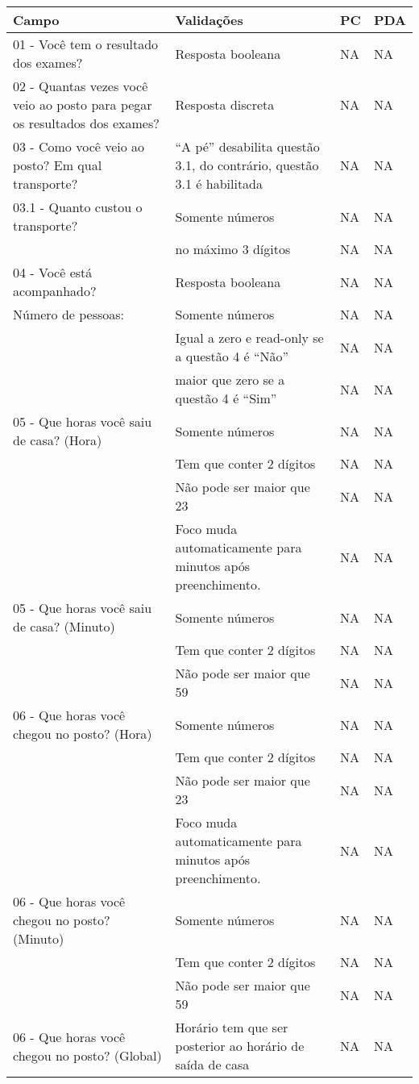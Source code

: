 \begin{longtable}{|p{}|p{}|p{}|p{}|}
\hline

Campo & Validações & PC & PDA \\ \hline

01 - Você tem o resultado dos exames? & Resposta booleana & NA & NA \\ \hline

02 - Quantas vezes você veio ao posto para pegar os resultados dos exames? & Resposta discreta & NA & NA \\ \hline

03 - Como você veio ao posto? Em qual transporte?  & ``A pé'' desabilita questão 3.1, do contrário, questão 3.1 é habilitada & NA & NA \\ \hline

03.1 - Quanto custou o transporte? & Somente números & NA & NA \\ \cline{2-4} & no máximo 3 dígitos & NA & NA \\ \hline

04 - Você está acompanhado? & Resposta booleana & NA & NA \\ \hline
Número de pessoas: & Somente números & NA & NA \\ \cline{2-4} & Igual a zero e read-only se a questão 4 é ``Não'' & NA & NA \\ \cline{2-4} & maior que zero se a questão 4 é ``Sim'' & NA & NA \\ \hline

05 - Que horas você saiu de casa? (Hora) & Somente números & NA & NA \\ \cline{2-4}  & Tem que conter 2 dígitos & NA & NA \\ \cline{2-4} & Não pode ser maior que 23 & NA & NA \\ \cline{2-4} & Foco muda automaticamente para minutos após preenchimento.  & NA & NA \\ \hline
05 - Que horas você saiu de casa? (Minuto) & Somente números & NA & NA \\ \cline{2-4}  & Tem que conter 2 dígitos & NA & NA \\ \cline{2-4} & Não pode ser maior que 59 & NA & NA \\ \hline

06 - Que horas você chegou no posto? (Hora) & Somente números & NA & NA \\ \cline{2-4}  & Tem que conter 2 dígitos & NA & NA \\ \cline{2-4} & Não pode ser maior que 23 & NA & NA \\ \cline{2-4} & Foco muda automaticamente para minutos após preenchimento.  & NA & NA \\ \hline
06 - Que horas você chegou no posto? (Minuto) & Somente números & NA & NA \\ \cline{2-4}  & Tem que conter 2 dígitos & NA & NA \\ \cline{2-4} & Não pode ser maior que 59 & NA & NA \\ \hline
06 - Que horas você chegou no posto? (Global) & Horário tem que ser posterior ao horário de saída de casa & NA & NA \\ \hline


\end{longtable}
